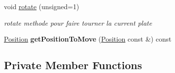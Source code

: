 \begin{DoxyCompactItemize}
void \mbox{\hyperlink{class_board_a6de0db1394cef93968fa0b25a22e1a04}{rotate}} (unsigned=1)
\begin{DoxyCompactList}\small\item\em rotate methode pour faire tourner la current plate \end{DoxyCompactList}\item 
\mbox{\label{class_board_ac9c76795aaccf2dfa77621a88601f4e4}} 
\mbox{\hyperlink{class_position}{Position}} {\bfseries get\+Position\+To\+Move} (\mbox{\hyperlink{class_position}{Position}} const \&) const
\end{DoxyCompactItemize}
\subsection*{Private Member Functions}
